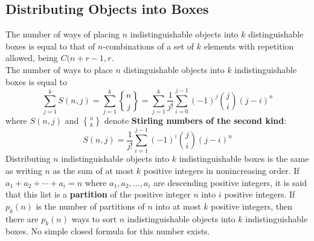 \documentclass[./Discrete Math.tex]{subfiles}
\begin{document}
		\subsection{Distributing Objects into Boxes}
			The number of ways of placing \(n\) indistinguishable objects into \(k\) distinguishable boxes is equal to that of \(n\)-combinations of a set of \(k\) elements with repetition allowed, being \(C(n + r - 1, r\). \\
			The number of ways to place \(n\) distinguishable objects into \(k\) indistinguishable boxes is equal to
				\[
					\sum_{j = 1}^k S(n, j) = \sum_{j = 1}^k {n \brace j} 
							= \sum_{j = 1}^k \frac{1}{j!}\sum_{i = 0}^{j - 1}(-1)^j\binom{j}{i}(j - i)^n
				\]
				where \(S(n, j)\) and \({n \brace k}\) denote \textbf{Stirling numbers of the second kind}:
				\[S(n, j) = \frac{1}{j!}\sum_{i = 1}^{j - 1}(-1)^i\binom{j}{i}(j - i)^n\]
			Distributing \(n\) indistinguishable objects into \(k\) indistinguishable boxes is the same as writing \(n\) as the sum of at most \(k\) positive integers in nonincreasing order. If \(a_1 + a_2 + \cdots + a_i = n\) where \(a_1, a_2, \ldots, a_i\) are descending positive integers, it is said that this list is a \textbf{partition} of the positive integer \(n\) into \(i\) positive integers. If \(p_k(n)\) is the number of partitions of \(n\) into at most \(k\) positive integers, then there are \(p_k(n)\) ways to sort \(n\) indistinguishable objects into \(k\) indistinguishable boxes. No simple closed formula for this number exists.
\end{document}
